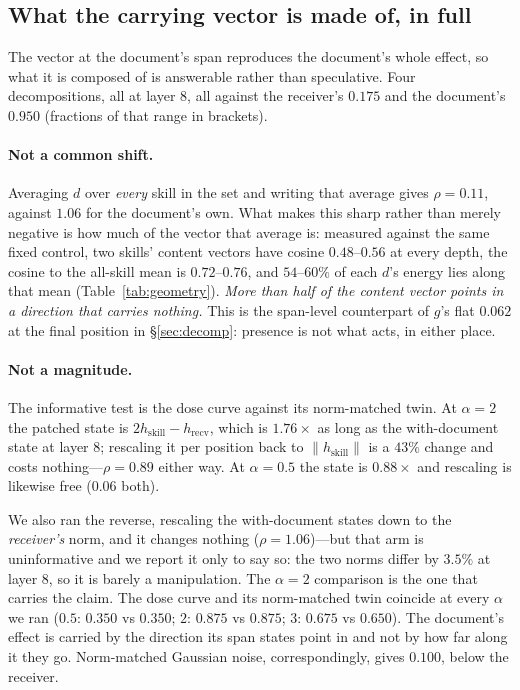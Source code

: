 \documentclass{article}
\newcommand{\dvec}{\ensuremath{d}}
\newcommand{\gvec}{\ensuremath{g}}
\begin{document}
\subsection{What the carrying vector is made of, in full}
\label{app:madeof}

The vector at the document's span reproduces the document's whole effect, so
what it is composed of is answerable rather than speculative. Four
decompositions, all at layer 8, all against the receiver's $0.175$ and the
document's $0.950$ (fractions of that range in brackets).

\paragraph{Not a common shift.} Averaging $\dvec$ over \emph{every} skill in the
set and writing that average gives $\rho = 0.11$, against $1.06$ for the
document's own. What makes this sharp rather than merely negative
is how much of the vector that average is: measured against the same fixed
control, two skills' content vectors have cosine $0.48$--$0.56$ at every depth,
the cosine to the all-skill mean is $0.72$--$0.76$, and $54$--$60\%$ of each
$\dvec$'s energy lies along that mean (Table~\ref{tab:geometry}). \emph{More than
half of the content vector points in a direction that carries nothing.} This is
the span-level counterpart of $\gvec$'s flat $0.062$ at
the final position in \S\ref{sec:decomp}: presence is not what acts, in either
place.

\paragraph{Not a magnitude.} The informative test is the dose curve against its
norm-matched twin. At $\alpha = 2$ the patched state is $2h_{\text{skill}} -
h_{\text{recv}}$, which is $1.76\times$ as long as the with-document state at
layer 8; rescaling it per position back to $\|h_{\text{skill}}\|$ is a $43\%$
change and costs nothing---$\rho = 0.89$ either way. At $\alpha = 0.5$ the state
is $0.88\times$ and rescaling is likewise free ($0.06$ both).

We also ran the reverse, rescaling the with-document states down to the
\emph{receiver's} norm, and it changes nothing ($\rho = 1.06$)---but that arm is
uninformative and we report it only to say so: the two norms differ by $3.5\%$ at
layer 8, so it is barely a manipulation. The $\alpha = 2$ comparison is the one
that carries the claim. The dose curve and its norm-matched twin coincide
at every $\alpha$ we ran ($0.5$: $0.350$ vs $0.350$; $2$: $0.875$ vs $0.875$;
$3$: $0.675$ vs $0.650$). The document's effect is carried by the direction its
span states point in and not by how far along it they go. Norm-matched Gaussian
noise, correspondingly, gives $0.100$, below the receiver.
\end{document}
